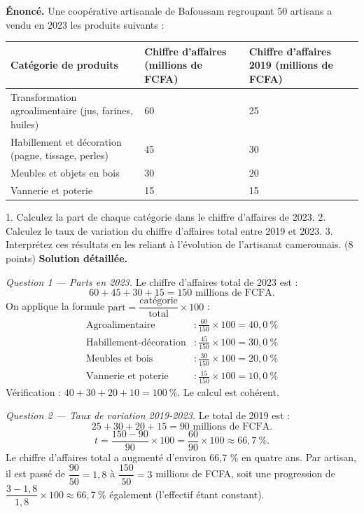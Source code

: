 \documentclass[11pt]{article}
\begin{document}
\begin{exoresolu}
\textbf{Énoncé.} Une coopérative artisanale de Bafoussam regroupant 50 artisans a vendu en 2023 les produits suivants :

\begin{center}
\begin{tabularx}{\linewidth}{|l|X|X|}\hline
\rowcolor{popblueL} \textbf{Catégorie de produits} & \textbf{Chiffre d'affaires (millions de FCFA)} & \textbf{Chiffre d'affaires 2019 (millions de FCFA)} \\ \hline
Transformation agroalimentaire (jus, farines, huiles) & 60 & 25 \\ \hline
Habillement et décoration (pagne, tissage, perles) & 45 & 30 \\ \hline
Meubles et objets en bois & 30 & 20 \\ \hline
Vannerie et poterie & 15 & 15 \\ \hline
\end{tabularx}
\end{center}

1. Calculez la part de chaque catégorie dans le chiffre d'affaires de 2023. 2. Calculez le taux de variation du chiffre d'affaires total entre 2019 et 2023. 3. Interprétez ces résultats en les reliant à l'évolution de l'artisanat camerounais. (8 points)
\tcblower
\textbf{Solution détaillée.}

\emph{Question 1 — Parts en 2023.} Le chiffre d'affaires total de 2023 est :
\[ 60 + 45 + 30 + 15 = 150 \text{ millions de FCFA.} \]
On applique la formule $\text{part} = \dfrac{\text{catégorie}}{\text{total}} \times 100$ :
\begin{align*}
\text{Agroalimentaire} &: \frac{60}{150} \times 100 = 40{,}0\ \% \\
\text{Habillement-décoration} &: \frac{45}{150} \times 100 = 30{,}0\ \% \\
\text{Meubles et bois} &: \frac{30}{150} \times 100 = 20{,}0\ \% \\
\text{Vannerie et poterie} &: \frac{15}{150} \times 100 = 10{,}0\ \%
\end{align*}
Vérification : $40 + 30 + 20 + 10 = 100\ \%$. Le calcul est cohérent.

\emph{Question 2 — Taux de variation 2019-2023.} Le total de 2019 est :
\[ 25 + 30 + 20 + 15 = 90 \text{ millions de FCFA.} \]
\[ t = \frac{150 - 90}{90} \times 100 = \frac{60}{90} \times 100 \approx 66{,}7\ \%. \]
Le chiffre d'affaires total a augmenté d'environ 66,7 \% en quatre ans. Par artisan, il est passé de $\dfrac{90}{50} = 1{,}8$ à $\dfrac{150}{50} = 3$ millions de FCFA, soit une progression de $\dfrac{3 - 1{,}8}{1{,}8} \times 100 \approx 66{,}7\ \%$ également (l'effectif étant constant).


\end{exoresolu}
\end{document}
